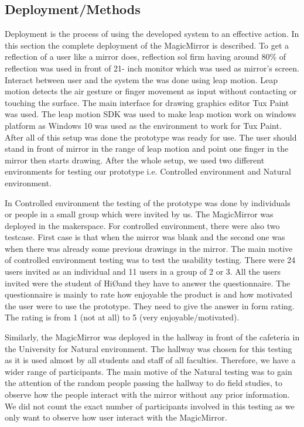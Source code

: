 \subsection{Deployment/Methods}
Deployment is the process of using the developed system to an effective action. In this section the complete deployment of the MagicMirror is described. To get a reflection of a user like a mirror does, reflection sol firm having around 80\% of reflection was used in front of 21- inch monitor which was used as mirror’s screen. Interact between user and the system the was done using leap motion. Leap motion detects the air gesture or finger movement as input without contacting or touching the surface. The main interface for drawing graphics editor Tux Paint was used. The leap motion SDK was used to make leap motion work on windows platform as Windows 10 was used as the environment to work for Tux Paint. After all of this setup was done the prototype was ready for use. The user should stand in front of mirror in the range of leap motion and point one finger in the mirror then starts drawing.
After the whole setup, we used two different environments for testing our prototype i.e. Controlled environment and Natural environment.

In Controlled environment the testing of the prototype was done by individuals or people in a small group which were invited by us. The MagicMirror was deployed in the makerspace. For controlled environment, there were also two testcase. First case is that when the mirror was blank and the second one was when there was already some previous drawings in the mirror. The main motive of controlled environment testing was to test the usability testing. There were 24 users invited as an individual and 11 users in a group of 2 or 3. All the users invited were the student of Hi\O and they have to answer the questionnaire. The questionnaire is mainly to rate how enjoyable the product is and how motivated the user were to use the prototype. They need to give the answer in form rating. The rating is from 1 (not at all) to 5 (very enjoyable/motivated).
 
Similarly, the MagicMirror was deployed in the hallway in front of the cafeteria in the University for Natural environment. The hallway was chosen for this testing as it is used almost by all students and staff of all faculties. Therefore, we have a wider range of participants. The main motive of the Natural testing was to gain the attention of the random people passing the hallway to do field studies, to observe how the people interact with the mirror without any prior information. We did not count the exact number of participants involved in this testing as we only want to observe how user interact with the MagicMirror.
